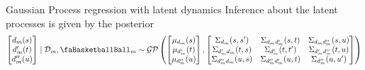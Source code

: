 \documentclass[ignorenonframetext,xcolor=pdflatex,table,dvipsnames,serif]{beamer}
\newcommand{\BTheta}{\text{\faBasketballBall}}
\begin{document}
\begin{frame}{Gaussian Process regression with latent dynamics}
Inference about the latent processes is given by the posterior 
{
\scriptsize
\begin{align*}
\begin{bmatrix}d_m(s)\\ d_m^\prime(t)\\ d_m^{\prime\prime}(u)\end{bmatrix} \mid \mathcal{D}_m, \BTheta_m \sim \mathcal{GP}\left(\begin{bmatrix}\mu_{d_m}(s)\\ \mu_{d_m^\prime}(t)\\ \mu_{d_m^{\prime\prime}}(u)\end{bmatrix}, \begin{bmatrix} \Sigma_{d_m}(s, s^\prime) & \Sigma_{d_m d_m^\prime}(s,t) & \Sigma_{d_m d_m^{\prime\prime}}(s,u)\\ \Sigma_{d_m^\prime d_m}(t,s) & \Sigma_{d_m^\prime}(t,t^\prime) & \Sigma_{d_m^\prime d_m^{\prime\prime}}(t,u)\\ \Sigma_{d_m^{\prime\prime} d_m}(u,s) & \Sigma_{d_m^{\prime\prime} d_m^\prime}(u,t) & \Sigma_{d_m^{\prime\prime}}(u,u^\prime)\end{bmatrix}\right)
\end{align*}	
}

\vspace{0.5cm}


\end{frame}
\end{document}
